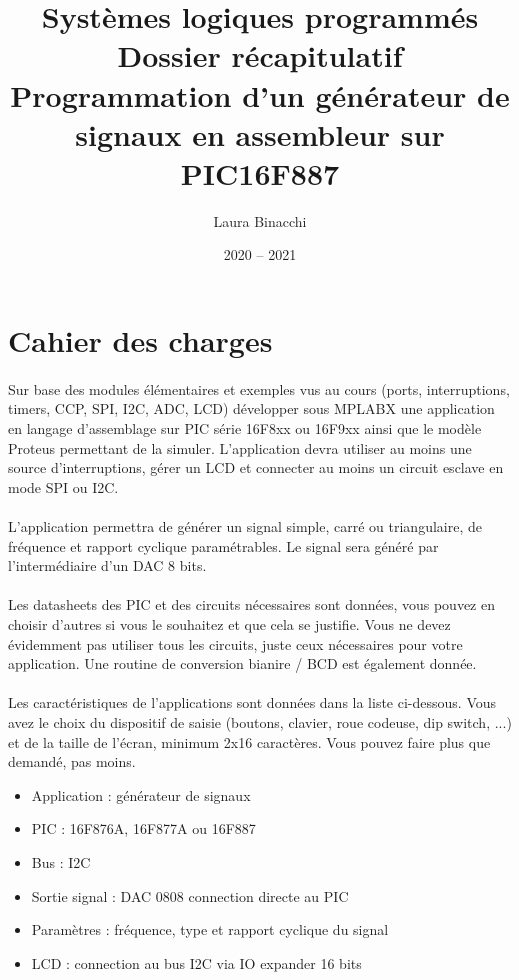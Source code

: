 \documentclass{article}
\title{Systèmes logiques programmés\bigbreak \bigbreak
    \large Dossier récapitulatif\bigbreak
    \normalsize Programmation d'un générateur de signaux en assembleur sur PIC16F887\bigbreak}
\date{2020 -- 2021}
\author{Laura Binacchi}
\begin{document}
    
    \newpage
    \tableofcontents
    \newpage

    \section{Cahier des charges}
    \paragraph{}
    Sur base des modules élémentaires et exemples vus au cours (ports, interruptions, timers, CCP, SPI, I2C, ADC, LCD) développer sous MPLABX une application en langage d’assemblage sur PIC série 16F8xx ou 16F9xx ainsi que le modèle Proteus permettant de la simuler. L’application devra utiliser au moins une source d’interruptions, gérer un LCD et connecter au moins un circuit esclave en mode SPI ou I2C.

    \paragraph{}
    L’application permettra de générer un signal simple, carré ou triangulaire, de fréquence et rapport cyclique paramétrables. Le signal sera généré par l’intermédiaire d’un DAC 8 bits.

    \paragraph{}
    Les datasheets des PIC et des circuits nécessaires sont données, vous pouvez en choisir d’autres si vous le souhaitez et que cela se justifie. Vous ne devez évidemment pas utiliser tous les circuits, juste ceux nécessaires pour votre application. Une routine de conversion bianire / BCD est également donnée.

    \paragraph{}
    Les caractéristiques de l'applications sont données dans la liste ci-dessous. Vous avez le choix du dispositif de saisie (boutons, clavier, roue codeuse, dip switch, ...) et de la taille de l’écran, minimum 2x16 caractères. Vous pouvez faire plus que demandé, pas moins.
    \begin{itemize}[label=$\bullet$]
        \item Application : générateur de signaux
        \item PIC : 16F876A, 16F877A ou 16F887
        \item Bus : I2C
        \item Sortie signal : DAC 0808 connection directe au PIC
        \item Paramètres : fréquence, type et rapport cyclique du signal
        \item LCD : connection au bus I2C via IO expander 16 bits
    \end{itemize}
\end{document}
